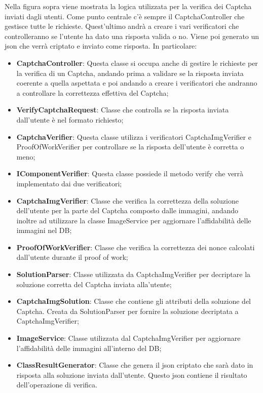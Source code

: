 Nella figura sopra viene mostrata la logica utilizzata per la verifica dei Captcha inviati dagli utenti. Come punto centrale c'è sempre il CaptchaController che gestisce tutte le richieste. Quest'ultimo andrà a creare i vari verificatori che controlleranno se l'utente ha dato una risposta valida o no. Viene poi generato un json che verrà criptato e inviato come risposta.
In particolare:
\begin{itemize}
	\item \textbf{CaptchaController}: Questa classe si occupa anche di gestire le richieste per la verifica di un Captcha, andando prima a validare se la risposta inviata coerente a quella aspettata e poi andando a creare i verificatori che andranno a controllare la correttezza effettiva del Captcha;
	\item \textbf{VerifyCaptchaRequest}: Classe che controlla se la risposta inviata dall'utente è nel formato richiesto;
	\item \textbf{CaptchaVerifier}: Questa classe utilizza i verificatori CaptchaImgVerifier e ProofOfWorkVerifier per controllare se la risposta dell'utente è corretta o meno;
	\item \textbf{IComponentVerifier}: Questa classe possiede il metodo verify che verrà implementato dai due verificatori; 
	\item \textbf{CaptchaImgVerifier}: Classe che verifica la correttezza della soluzione dell'utente per la parte del Captcha composto dalle immagini, andando inoltre ad utilizzare la classe ImageService per aggiornare l'affidabilità delle immagini nel DB;
	\item \textbf{ProofOfWorkVerifier}: Classe che verifica la correttezza dei nonce calcolati dall'utente durante il proof of work;
	\item \textbf{SolutionParser}: Classe utilizzata da CaptchaImgVerifier per decriptare la soluzione corretta del Captcha inviata alla'utente;
	\item \textbf{CaptchaImgSolution}: Classe che contiene gli attributi della soluzione del Captcha. Creata da SolutionParser per fornire la soluzione decriptata a CaptchaImgVerifier;
	\item \textbf{ImageService}: Classe utilizzata dal CaptchaImgVerifier per aggiornare l'affidabilità delle immagini all'interno del DB;
	\item \textbf{ClassResultGenerator}: Classe che genera il json criptato che sarà dato in risposta alla soluzione inviata dall'utente. Questo json contiene il risultato dell'operazione di verifica.
\end{itemize}

